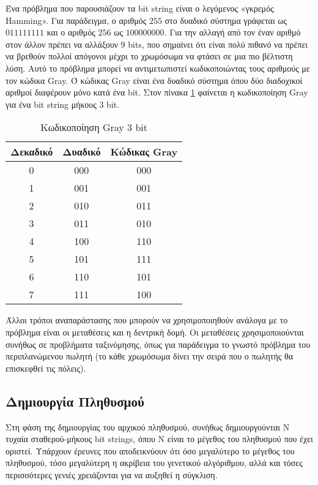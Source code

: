 Ένα πρόβλημα που παρουσιάζουν τα bit string είναι ο λεγόμενος «γκρεμός Hamming». Για παράδειγμα, ο αριθμός $255$ στο δυαδικό σύστημα γράφεται ως $011111111$ και ο αριθμός $256$ ως $100000000$. Για την αλλαγή από τον έναν αριθμό στον άλλον πρέπει να αλλάξουν $9$ bits, που σημαίνει ότι είναι πολύ πιθανό να πρέπει να βρεθούν πολλοί απόγονοι μέχρι το χρωμόσωμα να φτάσει σε μια πιο βέλτιστη λύση. Αυτό το πρόβλημα μπορεί να αντιμετωπιστεί κωδικοποιώντας τους αριθμούς με τον κώδικα Gray. Ό κώδικας Gray είναι ένα δυαδικό σύστημα όπου δύο διαδοχικοί αριθμοί διαφέρουν μόνο κατά ένα bit. \cite{Lehre} Στον πίνακα \ref{table_gray_code} φαίνεται η κωδικοποίηση Gray για ένα bit string μήκους 3 bit.

\begin{table}[!t]
    \renewcommand{\arraystretch}{1.3}
    \caption{Κωδικοποίηση Gray 3 bit}
    \label{table_gray_code}
    \centering
    \begin{tabular}{c|c|c}
        \hline
        \bfseries Δεκαδικό & \bfseries Δυαδικό & \bfseries Κώδικας Gray\\
        \hline\hline
        0 & 000 & 000\\
        1 & 001 & 001\\
        2 & 010 & 011\\
        3 & 011 & 010\\
        4 & 100 & 110\\
        5 & 101 & 111\\
        6 & 110 & 101\\
        7 & 111 & 100\\
        \hline
    \end{tabular}
\end{table}

Άλλοι τρόποι αναπαράστασης που μπορούν να χρησιμοποιηθούν ανάλογα με το πρόβλημα είναι οι μεταθέσεις και η δεντρική δομή. Οι μεταθέσεις χρησιμοποιούνται συνήθως σε προβλήματα ταξινόμησης, όπως για παράδειγμα το γνωστό πρόβλημα του περιπλανώμενου πωλητή (το κάθε χρωμόσωμα δίνει την σειρά που ο πωλητής θα επισκεφθεί τις πόλεις). \cite{Obitko}

\subsection{Δημιουργία Πληθυσμού}

Στη φάση της δημιουργίας του αρχικού πληθυσμού, συνήθως δημιουργούνται Ν τυχαία σταθερού-μήκους bit strings, όπου Ν είναι το μέγεθος του πληθυσμού που έχει οριστεί. Υπάρχουν έρευνες που αποδεικνύουν ότι όσο μεγαλύτερο το μέγεθος του πληθυσμού, τόσο μεγαλύτερη η ακρίβεια του γενετικού αλγόριθμου, αλλά και τόσες περισσότερες γενιές χρειάζονται για να αυξηθεί η σύγκλιση. \cite{Gotshall2008}

